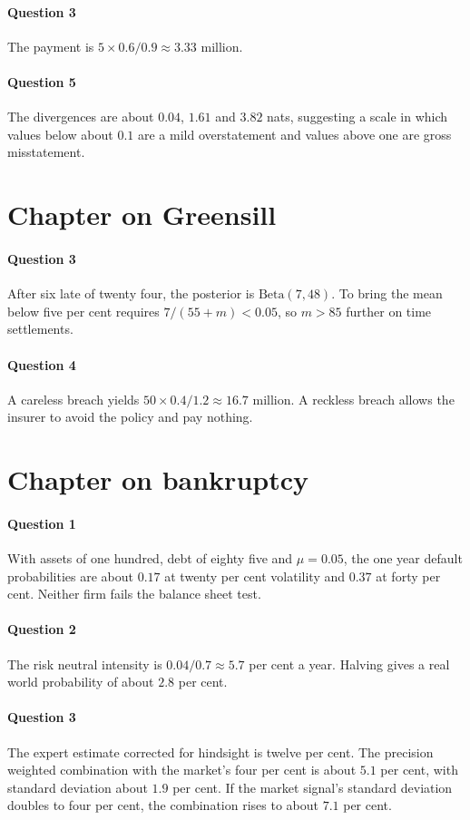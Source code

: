 \paragraph{Question 3} The payment is $5\times 0.6/0.9 \approx 3.33$ million.
\paragraph{Question 5} The divergences are about $0.04$, $1.61$ and $3.82$ nats, suggesting a scale in which values below about $0.1$ are a mild overstatement and values above one are gross misstatement.

\section*{Chapter on Greensill}
\paragraph{Question 3} After six late of twenty four, the posterior is $\text{Beta}(7, 48)$. To bring the mean below five per cent requires $7/(55 + m) < 0.05$, so $m > 85$ further on time settlements.
\paragraph{Question 4} A careless breach yields $50\times 0.4/1.2 \approx 16.7$ million. A reckless breach allows the insurer to avoid the policy and pay nothing.

\section*{Chapter on bankruptcy}
\paragraph{Question 1} With assets of one hundred, debt of eighty five and $\mu = 0.05$, the one year default probabilities are about $0.17$ at twenty per cent volatility and $0.37$ at forty per cent. Neither firm fails the balance sheet test.
\paragraph{Question 2} The risk neutral intensity is $0.04/0.7\approx 5.7$ per cent a year. Halving gives a real world probability of about $2.8$ per cent.
\paragraph{Question 3} The expert estimate corrected for hindsight is twelve per cent. The precision weighted combination with the market's four per cent is about $5.1$ per cent, with standard deviation about $1.9$ per cent. If the market signal's standard deviation doubles to four per cent, the combination rises to about $7.1$ per cent.

